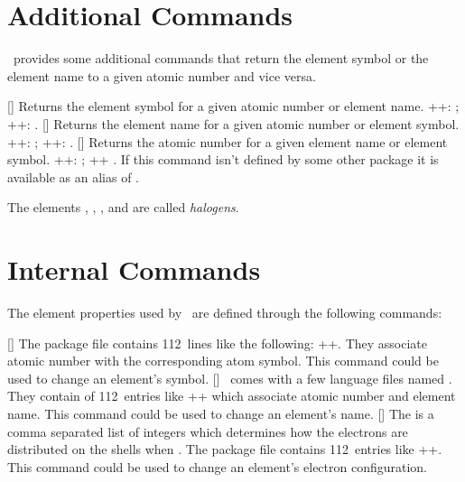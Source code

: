 \documentclass[load-preamble+]{cnltx-doc}
\begin{document}
\section{Additional Commands}\label{sec:additional-commands}
\BOHR\ provides some additional commands that return the element symbol or the
element name to a given atomic number and vice versa.
\begin{commands}
  []
    Returns the element symbol for a given atomic number or element name.
    \verbcode++: ;
    \verbcode++: .
  []
    Returns the element name for a given atomic number or element symbol.
    \verbcode++: ;
    \verbcode++: .
  []
    Returns the atomic number for a given element name or element symbol.
    \verbcode++: ;
    \verbcode++ .
    If this command isn't defined by some other package it is available as an
    alias of .
\end{commands}

\begin{example}
  The elements , , ,
   and  are called \emph{halogens}.
\end{example}

\section{Internal Commands}\label{sec:internal-commands}
The element properties used by \BOHR\ are defined through the following commands:
\begin{commands}
  []
    The package file contains 112~lines like the following:
    \verbcode++.  They associate atomic number with
    the corresponding atom symbol.  This command could be used to change an
    element's symbol.
  []
    \BOHR\ comes with a few language files named
    .  They contain of 112~entries
    like \verbcode++ which associate atomic number
    and element name.  This command could be used to change an element's name.
  []
    The  is a comma separated list of integers
    which determines how the electrons are distributed on the shells when
    .  The package file contains
    112~entries like \verbcode++.
    This command could be used to change an element's electron configuration.
\end{commands}

\clearpage
\end{document}
